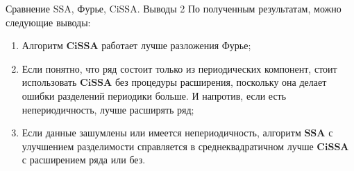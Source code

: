 \documentclass[notheorems, handout]{beamer}
\newcommand{\SSA}{\textbf{SSA}}
\newcommand{\CISSA}{\textbf{CiSSA}}
\begin{document}
	
	\begin{frame}{Сравнение SSA, Фурье, CiSSA. Выводы 2}
		По полученным результатам, можно следующие выводы: 
		\begin{enumerate}
			\item Алгоритм $\CISSA$ работает лучше разложения Фурье;
			\item Если понятно, что ряд состоит только из периодических компонент, стоит использовать $\CISSA$ без процедуры расширения, поскольку она делает ошибки разделений периодики больше. И напротив, если есть непериодичность, лучше расширять ряд;
			\item Если данные зашумлены или имеется непериодичность, алгоритм $\SSA$ с улучшением разделимости справляется в среднеквадратичном лучше $\CISSA$ с расширением ряда или без. 
		\end{enumerate}
	\end{frame}
	
	
	
	
	
\end{document}
